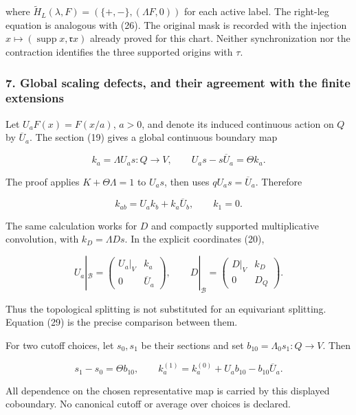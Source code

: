 where \(\widetilde H_L(\lambda,F)=(\{+,-\},(\Lambda F,0))\) for each active label. The right-leg
equation is analogous with (26). The original mask is recorded with the injection
\(x\mapsto(\operatorname{supp}x,\mathfrak r x)\) already proved for this chart. Neither
synchronization nor the contraction identifies the three supported origins with \(\tau\).

\subsubsection{7. Global scaling defects, and their agreement with the finite
extensions}\label{pr_10:global-scaling-defects-and-their-agreement-with-the-finite-extensions}

Let \(U_aF(x)=F(x/a)\), \(a>0\), and denote its induced continuous action on \(Q\) by
\(\overline U_a\). The section (19) gives a global continuous boundary map

\[\boxed{k_a=\Lambda U_a s:Q\to V,\qquad
U_a s-s\overline U_a=\Theta k_a.}\tag{29}\]

The proof applies \(K+\Theta\Lambda=1\) to \(U_as\), then uses \(qU_as=\overline U_a\). Therefore

\[k_{ab}=U_a k_b+k_a\overline U_b,\qquad k_1=0.\tag{30}\]

The same calculation works for \(D\) and compactly supported multiplicative convolution, with
\(k_D=\Lambda D s\). In the explicit coordinates (20),

\[\boxed{U_a|_{\mathscr B}=\begin{pmatrix}U_a|_V&k_a\\0&\overline U_a\end{pmatrix},
\qquad D|_{\mathscr B}=\begin{pmatrix}D|_V&k_D\\0&D_Q\end{pmatrix}.}\tag{31}\]

Thus the topological splitting is not substituted for an equivariant splitting. Equation (29) is the
precise comparison between them.

For two cutoff choices, let \(s_0,s_1\) be their sections and set \(b_{10}=\Lambda_0s_1:Q\to V\).
Then

\[s_1-s_0=\Theta b_{10},\qquad
k_a^{(1)}=k_a^{(0)}+U_ab_{10}-b_{10}\overline U_a.\tag{32}\]

All dependence on the chosen representative map is carried by this displayed coboundary. No
canonical cutoff or average over choices is declared.

